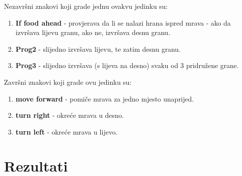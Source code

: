 Nezavršni znakovi koji grade jednu ovakvu jedinku su:

\begin{enumerate}

  \item \textbf{If food ahead} - provjerava da li se nalazi hrana ispred mrava - ako da izvršava lijevu granu, ako ne, izvršava desnu granu.
  \item \textbf{Prog2} - slijedno izvršava lijevu, te zatim desnu granu.
  \item \textbf{Prog3} - slijedno izvršava (s lijeva na desno) svaku od 3 pridružene grane.

\end{enumerate}

Završni znakovi koji grade ovu jedinku su:
\begin{enumerate}

  \item \textbf{move forward} - pomiče mrava za jedno mjesto unaprijed.
  \item \textbf{turn right} - okreće mrava u desno.
  \item \textbf{turn left} - okreće mrava u lijevo.

\end{enumerate}





\section{Rezultati}